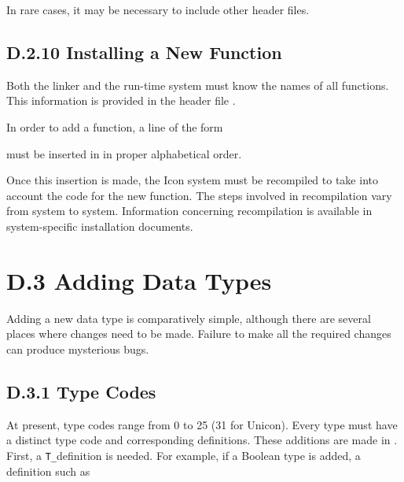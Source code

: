 In rare cases, it may be necessary to include other header files.
%

\subsection[D.2.10 Installing a New Function]{D.2.10 Installing a New Function}

Both the linker and the run-time system must know the names of all
functions. This information is provided in the header file .


In order to add a function, a line of the form

\noindent must be inserted in  in proper alphabetical order.

Once this insertion is made, the Icon system must be recompiled to
take into account the code for the new function. The steps involved in
recompilation vary from system to system. Information concerning
recompilation is available in system-specific installation documents.

\section[D.3 Adding Data Types]{D.3 Adding Data Types}

Adding a new data type is comparatively simple, although there are
several places where changes need to be made. Failure to make all the
required changes can produce mysterious bugs.

\subsection[D.3.1 Type Codes]{D.3.1 Type Codes}

At present, type codes range from 0 to 25 {\color{blue} (31 for
Unicon)}. Every type must have a distinct type code and corresponding
definitions.  These additions are made in . First, a
\texttt{T\_}definition is needed. For example, if a Boolean type is added,
a definition such as


